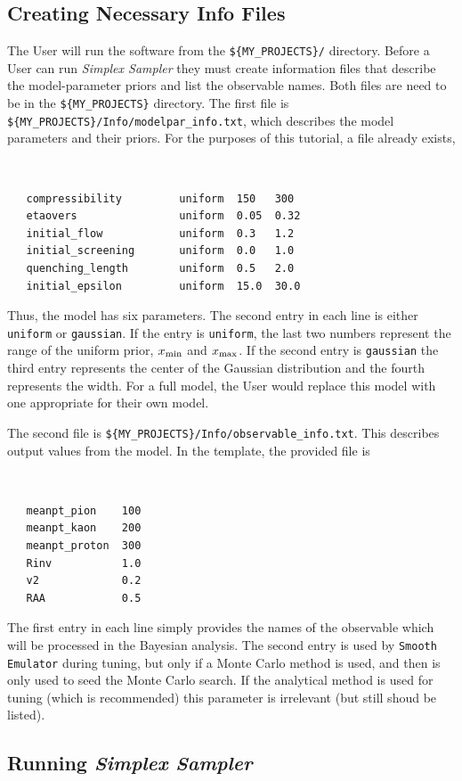\documentclass[UserManual.tex]{subfiles}
\begin{document}
\subsection{Creating Necessary Info Files}
The User will run the software from the {\tt \$\{MY\_PROJECTS\}/} directory. Before a User can run {\it Simplex Sampler} they must create information files that describe the model-parameter priors and list the observable names. Both files are need to be in the {\tt \$\{MY\_PROJECTS\}} directory. The first file is {\tt \$\{MY\_PROJECTS\}/Info/modelpar\_info.txt}, which describes the model parameters and their priors. For the purposes of this tutorial, a file already exists,
{\tt
\begin{verbatim}
   compressibility         uniform  150   300
   etaovers                uniform  0.05  0.32
   initial_flow            uniform  0.3   1.2
   initial_screening       uniform  0.0   1.0
   quenching_length        uniform  0.5   2.0
   initial_epsilon         uniform  15.0  30.0
\end{verbatim}
}
Thus, the model has six parameters. The second entry in each line is either {\tt uniform} or {\tt gaussian}. If the entry is {\tt uniform}, the last two numbers represent the range of the uniform prior, $x_{\rm min}$ and $x_{\rm max}$. If the second entry is {\tt gaussian} the third entry represents the center of the Gaussian distribution and the fourth represents the width. For a full model, the User would replace this model with one appropriate for their own model.

The second file is {\tt \$\{MY\_PROJECTS\}/Info/observable\_info.txt}. This describes output values from the model. In the template, the provided file is
{\tt
\begin{verbatim}
   meanpt_pion    100      
   meanpt_kaon    200      
   meanpt_proton  300      
   Rinv           1.0      
   v2             0.2     
   RAA            0.5
\end{verbatim}
}
The first entry in each line simply provides the names of the observable which will be processed in the Bayesian analysis.  The second entry is used by {\tt Smooth Emulator} during tuning, but only if a Monte Carlo method is used, and then is only used to seed the Monte Carlo search. If the analytical method is used for tuning (which is recommended) this parameter is irrelevant (but still shoud be listed).

\subsection{Running {\it Simplex Sampler}}
\end{document}
